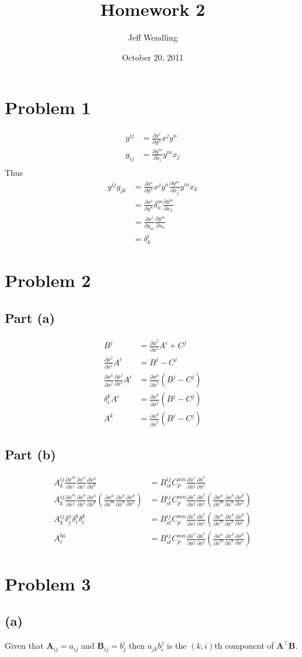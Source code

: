 \documentclass[12pt]{article}
\title{Homework 2}
\author{Jeff Wendling}
\date{October 20, 2011}
\newcommand{\eq}[1]{\begin{align*}#1\end{align*}}
\newcommand{\p}[2]{\frac{\partial#1}{\partial#2}}
\newcommand{\co}[2]{\p{x^#1}{\bar{x}^#2}}
\newcommand{\con}[2]{\p{\bar{x}^#1}{x^#2}}
\begin{document}
\maketitle
\section*{Problem 1}
\eq{
	g^{ij} &= \p{x^i}{y^n}{x^j}{y^n}\\
	g_{ij} &= \p{y^m}{x_i}{y^m}{x_j}\\
}
Thus
\eq{
	g^{ij}g_{jk} &= \p{x^i}{y^n}{x^j}{y^n}\p{y^m}{x_j}{y^m}{x_k}\\
	&= \p{x^i}{y^n}\delta_n^m\p{y^m}{x_k}\\
	&= \p{x^i}{y_m}\p{y^m}{x_k}\\
	&= \delta_k^i
}
\section*{Problem 2}
\subsection*{Part (a)}
\eq{
	B^j &= \p{\bar{x}^j}{x^i}A^i + C^j\\
	\p{\bar{x}^j}{x^i}A^i &= B^j - C^j\\
	\p{x^k}{\bar{x}^j}\p{\bar{x}^j}{x^i}A^i &= \p{x^k}{\bar{x}^j}(B^j - C^j)\\
	\delta_i^k A^i &= \p{x^k}{\bar{x}^j}(B^j - C^j)\\
	A^k &= \p{x^k}{\bar{x}^j}(B^j - C^j)
}
\subsection*{Part (b)}
\eq{
	A^{ij}_k \con{m}{j}\con{n}{i}\co{k}{p} &= B^{ij}_{st}C^{mn}_p \con{s}{j}\con{t}{i}\\
	A^{ij}_k \con{m}{j}\con{n}{i}\co{k}{p}(\co{a}{m}\co{b}{n}\con{p}{c}) &= B^{ij}_{st}C^{mn}_p \con{s}{j}\con{t}{i}(\co{a}{m}\co{b}{n}\con{p}{c})\\
	A^{ij}_k \delta^a_j\delta^b_i\delta^k_c &= B^{ij}_{st}C^{mn}_p \con{s}{j}\con{t}{i}(\co{a}{m}\co{b}{n}\con{p}{c})\\
	A^{ba}_c &= B^{ij}_{st}C^{mn}_p \con{s}{j}\con{t}{i}(\co{a}{m}\co{b}{n}\con{p}{c})
}
\section*{Problem 3}
\subsection*{(a)} Given that $\bm{A}_{ij} = a_{ij}$ and $\bm{B}_{ij} = b^i_j$ then $a_{jk}b_i^j$ is the $(k, i)$th component of $\bm{A}^\top\bm{B}$.
\end{document}
